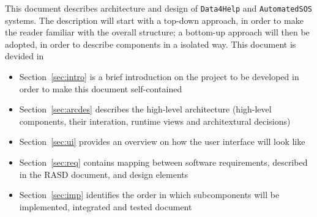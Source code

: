 \documentclass[../DD0.tex]{subfiles}
\begin{document}
  This document describes architecture and design of \texttt{Data4Help} and \texttt{AutomatedSOS} systems. The description will start with a top-down approach, in order to make the reader familiar with the overall structure; a bottom-up approach will then be adopted, in order to describe components in a isolated way. This document is devided in
  \begin{itemize}
    \item Section~\ref{sec:intro} is a brief introduction on the project to be developed in order to make this document self-contained

    \item Section~\ref{sec:arcdes} describes the high-level architecture (high-level components, their interation, runtime views and architextural decisions)

    \item Section~\ref{sec:ui} provides an overview on how the user interface will look like

    \item Section~\ref{sec:req} contains mapping between software requirements, described in the RASD document, and design elements

    \item Section~\ref{sec:imp} identifies the order in which subcomponents will be implemented, integrated and tested document
  \end{itemize}
\end{document}
